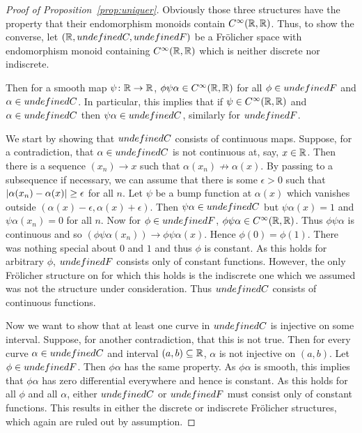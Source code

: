 \documentclass[%
a4paper,%
arxiv,%
defaults
]{myclass}
\begin{document}
\begin{proof}[{Proof of Proposition~\ref{prop:uniquer}}]
Obviously those three structures have the property that their endomorphism monoids contain \(C^\infty(\mathbb{R},\mathbb{R})\).
Thus, to show the converse, let \((\R, \m{C}, \m{F})\) be a Fr\"olicher space with endomorphism monoid containing \(C^\infty(\mathbb{R},\mathbb{R})\) which is neither discrete nor indiscrete.

Then for a smooth map \(\psi \colon \mathbb{R} \to \mathbb{R}\), \(\phi \psi \alpha \in C^\infty(\mathbb{R},\mathbb{R})\) for all \(\phi \in \m{F}\) and \(\alpha \in \m{C}\).
In particular, this implies that if \(\psi \in C^\infty(\mathbb{R},\mathbb{R})\) and \(\alpha \in \m{C}\) then \(\psi \alpha \in \m{C}\), similarly for \(\m{F}\).

We start by showing that \(\m{C}\) consists of continuous maps.
Suppose, for a contradiction, that \(\alpha \in \m{C}\) is not continuous at, say, \(x \in \mathbb{R}\).
Then there is a sequence \((x_n) \to x\) such that \(\alpha(x_n) \not\to \alpha(x)\).
By passing to a subsequence if necessary, we can assume that there is some \(\epsilon > 0\) such that \(\abs{\alpha(x_n) - \alpha(x)} \ge \epsilon\) for all \(n\).
Let \(\psi\) be a bump function at \(\alpha(x)\) which vanishes outside \((\alpha(x) - \epsilon, \alpha(x) + \epsilon)\).
Then \(\psi \alpha \in \m{C}\) but \(\psi \alpha(x) = 1\) and \(\psi \alpha(x_n) = 0\) for all \(n\).
Now for \(\phi \in \m{F}\), \(\phi \psi \alpha \in C^\infty(\mathbb{R},\mathbb{R})\).
Thus \(\phi \psi \alpha\) is continuous and so \((\phi \psi \alpha(x_n)) \to \phi \psi \alpha(x)\).
Hence \(\phi(0) = \phi(1)\).
There was nothing special about \(0\) and \(1\) and thus \(\phi\) is constant.
As this holds for arbitrary \(\phi\), \(\m{F}\) consists only of constant functions.
However, the only Fr\"olicher structure on \R for which this holds is the indiscrete one which we assumed was not the structure under consideration.
Thus \(\m{C}\) consists of continuous functions.

Now we want to show that at least one curve in \(\m{C}\) is injective on some interval.
Suppose, for another contradiction, that this is not true.
Then for every curve \(\alpha \in \m{C}\) and interval \((a,b) \subseteq \mathbb{R}\), \(\alpha\) is not injective on \((a,b)\).
Let \(\phi \in \m{F}\).
Then \(\phi \alpha\) has the same property.
As \(\phi \alpha\) is smooth, this implies that \(\phi \alpha\) has zero differential everywhere and hence is constant.
As this holds for all \(\phi\) and all \(\alpha\), either \(\m{C}\) or \(\m{F}\) must consist only of constant functions.
This results in either the discrete or indiscrete Fr\"olicher structures, which again are ruled out by assumption.


\end{proof}
\end{document}
